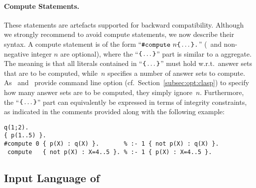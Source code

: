 \paragraph{Compute Statements.}
These statements are artefacts supported for backward compatibility.
Although we strongly recommend to avoid compute statements,
we now describe their syntax.
A compute statement is of the form
``$\const{\#compute}~n \code{\char`\{}\dots\code{\char`\}}\code{.}$''
(\code{\#}~and non-negative integer $n$ are optional),
where the ``$\code{\char`\{}\dots\code{\char`\}}$'' part
is similar to a  aggregate.
The meaning is that all literals contained in
``$\code{\char`\{}\dots\code{\char`\}}$'' must hold w.r.t.\ answer sets
that are to be computed,
while~$n$ specifies a number of answer sets to compute.
As \clasp\ and \clingo\ provide command line option
 (cf.\ Section~\ref{subsec:opt:clasp})
to specify how many answer sets are to be computed,
they simply ignore~$n$.
Furthermore,
the ``$\code{\char`\{}\dots\code{\char`\}}$'' part can equivalently
be expressed in terms of integrity constraints,
as indicated in the comments provided along with the following example:
%
\begin{lstlisting}[xrightmargin=-20pt,numbers=none]
q(1;2).
{ p(1..5) }.
#compute 0 { p(X) : q(X) }.       % :- 1 { not p(X) : q(X) }.
 compute   { not p(X) : X=4..5 }. % :- 1 { p(X) : X=4..5 }.
\end{lstlisting}


\subsection{Input Language of \iclingo}\label{subsec:lang:iclingo}

